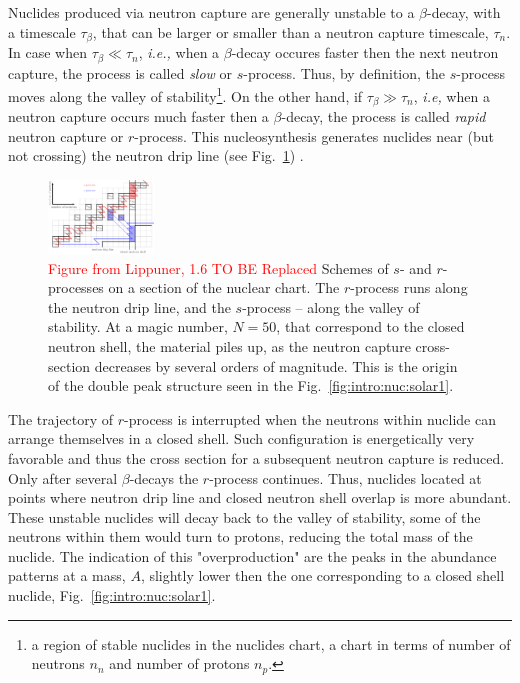 \documentclass[11pt,a4paper,headinclude=true,DIV=14,BCOR=8mm,chapterprefix,listof=totoc,twoside,openright,abstracton]{scrbook}
\newcommand{\red}[1]{\textcolor{red}{#1}}
\begin{document}
Nuclides produced via neutron capture are generally unstable to a $\beta$-decay, with a timescale $\tau_{\beta}$, that can be larger or smaller than a neutron capture timescale, $\tau_n$. 
In case when $\tau_{\beta}\ll\tau_n$, \textit{i.e.,} when a $\beta$-decay occures faster then the next neutron capture, the process is called \textit{slow} or $s$-process. 
Thus, by definition, the $s$-process moves along the valley of stability\footnote{a region of stable nuclides in the nuclides chart, a chart in terms of number of neutrons $n_n$ and number of protons $n_p$.}.
On the other hand, if $\tau_{\beta}\gg\tau_n$, \textit{i.e,} when a neutron capture occurs much faster then a $\beta$-decay, the process is called \textit{rapid} neutron capture or $r$-process. This nucleosynthesis generates nuclides near (but not crossing) the neutron drip line (see Fig.~\ref{fig:intro:nuc:srprocess}) \cite{Rolfs:1988}. 

\begin{figure}[t]
    \centering
    \includegraphics[width=0.25\textwidth]{./figs/intro_nuc_LipF16.png}
    \caption{
        \red{Figure from Lippuner, 1.6 TO BE Replaced}
        Schemes of $s$- and $r$-processes on a section of the nuclear chart. 
        The $r$-process runs along the neutron drip line, and the $s$-process -- along the valley of stability. 
        At a magic number, $N=50$, that correspond to the closed neutron shell, the material piles up, as the neutron capture cross-section decreases by several orders of magnitude. 
        This is the origin of the double peak structure seen in the Fig.~\ref{fig:intro:nuc:solar1}.
    }
    \label{fig:intro:nuc:srprocess}
\end{figure}

The trajectory of $r$-process is interrupted when the neutrons within nuclide can arrange themselves in a closed shell. Such configuration is energetically very favorable and thus the cross section for a subsequent neutron capture is reduced. Only after several $\beta$-decays the $r$-process continues. 
Thus, nuclides located at points where neutron drip line and closed neutron shell overlap is more abundant. These unstable nuclides will decay back to the valley of stability, some of the neutrons within them would turn to protons, reducing the total mass of the nuclide. 
The indication of this "overproduction" are the peaks in the abundance patterns at a mass, $A$, slightly lower then the one corresponding to a closed shell nuclide, Fig.~\ref{fig:intro:nuc:solar1}. 
\end{document}
